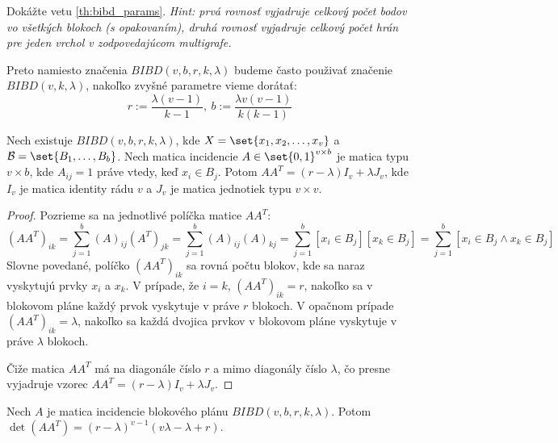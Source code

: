\begin{exercise}
Dokážte vetu \ref{th:bibd_params}. \emph{Hint: prvá rovnosť vyjadruje celkový počet bodov vo všetkých blokoch (s opakovaním), druhá rovnosť vyjadruje celkový počet hrán pre jeden vrchol v zodpovedajúcom multigrafe.}
\end{exercise}

\begin{corollary}
Preto namiesto značenia $BIBD(v, b, r, k, \lambda)$ budeme často
použivať značenie $BIBD(v, k, \lambda)$, nakoľko 
zvyšné parametre vieme dorátať: 
$$r := \dfrac{\lambda (v-1)}{k-1},~ b := \dfrac{\lambda v (v-1)}{k (k-1)}$$
\end{corollary}

\begin{theorem}

Nech existuje $BIBD(v, b,r, k, \lambda)$, kde $X = \set{x_1, x_2, \ldots, x_v}$ a $\mathcal{B} = \set{B_1, \ldots, B_b}$. 
Nech matica incidencie $A \in \set{0, 1}^{v \times b}$ je matica typu $v\times b$, kde $A_{ij} = 1$ práve vtedy, keď $x_i \in B_j$.
Potom $A A^T = (r-\lambda) I_v + \lambda J_{v}$, kde $I_v$ je matica identity rádu $v$ a $J_v$ je matica jednotiek typu $v \times v$.
\end{theorem}

\begin{proof}
Pozrieme sa na jednotlivé políčka matice $A A^T$:
\begin{equation*}
(AA^T)_{ik} = \sum_{j=1}^b (A)_{ij} (A^T)_{jk} = \sum_{j=1}^b (A)_{ij} (A)_{kj} = \sum_{j=1}^b [x_i \in B_j] [x_k \in B_j] = \sum_{j=1}^b [x_i \in B_j \wedge x_k \in B_j]
\end{equation*}
Slovne povedané, políčko $(AA^T)_{ik}$ sa rovná počtu blokov, kde sa naraz vyskytujú prvky $x_i$ a $x_k$.
V prípade, že $i = k$, $(AA^T)_{ik} = r$, nakoľko sa v blokovom pláne každý prvok vyskytuje v práve $r$ blokoch.
V opačnom prípade $(AA^T)_{ik} = \lambda$, nakoľko sa každá dvojica prvkov v blokovom pláne vyskytuje v práve $\lambda$ blokoch.

Čiže matica $AA^T$ má na diagonále číslo $r$ a mimo diagonály číslo $\lambda$, čo presne vyjadruje vzorec $A A^T = (r-\lambda) I_v + \lambda J_{v}$. 
\end{proof}


\begin{lemma}
\label{lem:aat_det}
Nech $A$ je matica incidencie blokového plánu $BIBD(v, b,r, k, \lambda)$. Potom $\det(AA^T) = (r-\lambda)^{v-1} (v\lambda - \lambda + r)$.
\end{lemma}

